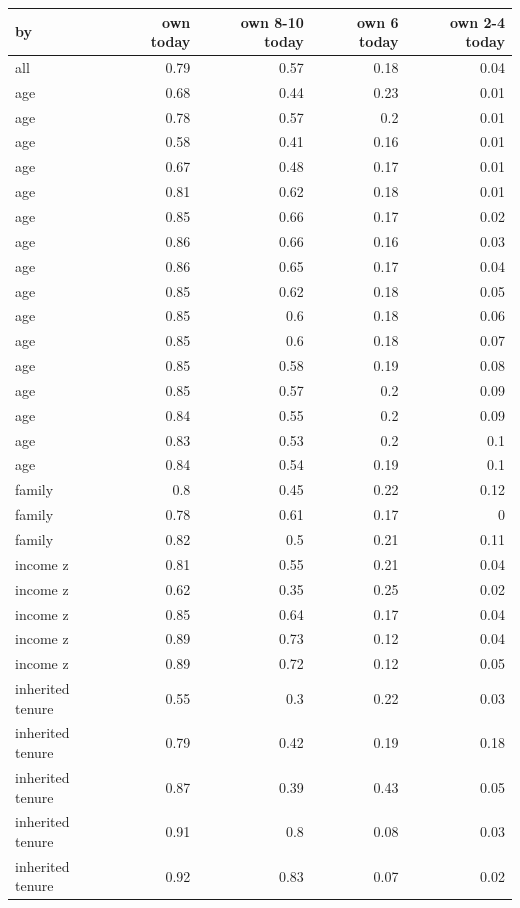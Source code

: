 \begin{tabular}{lrrrr}
\toprule
by & own today & own 8-10 today & own 6 today & own 2-4 today \\
\midrule
all & 0.79 & 0.57 & 0.18 & 0.04 \\
age & 0.68 & 0.44 & 0.23 & 0.01 \\
age & 0.78 & 0.57 & 0.2 & 0.01 \\
age & 0.58 & 0.41 & 0.16 & 0.01 \\
age & 0.67 & 0.48 & 0.17 & 0.01 \\
age & 0.81 & 0.62 & 0.18 & 0.01 \\
age & 0.85 & 0.66 & 0.17 & 0.02 \\
age & 0.86 & 0.66 & 0.16 & 0.03 \\
age & 0.86 & 0.65 & 0.17 & 0.04 \\
age & 0.85 & 0.62 & 0.18 & 0.05 \\
age & 0.85 & 0.6 & 0.18 & 0.06 \\
age & 0.85 & 0.6 & 0.18 & 0.07 \\
age & 0.85 & 0.58 & 0.19 & 0.08 \\
age & 0.85 & 0.57 & 0.2 & 0.09 \\
age & 0.84 & 0.55 & 0.2 & 0.09 \\
age & 0.83 & 0.53 & 0.2 & 0.1 \\
age & 0.84 & 0.54 & 0.19 & 0.1 \\
family & 0.8 & 0.45 & 0.22 & 0.12 \\
family & 0.78 & 0.61 & 0.17 & 0 \\
family & 0.82 & 0.5 & 0.21 & 0.11 \\
income z & 0.81 & 0.55 & 0.21 & 0.04 \\
income z & 0.62 & 0.35 & 0.25 & 0.02 \\
income z & 0.85 & 0.64 & 0.17 & 0.04 \\
income z & 0.89 & 0.73 & 0.12 & 0.04 \\
income z & 0.89 & 0.72 & 0.12 & 0.05 \\
inherited tenure & 0.55 & 0.3 & 0.22 & 0.03 \\
inherited tenure & 0.79 & 0.42 & 0.19 & 0.18 \\
inherited tenure & 0.87 & 0.39 & 0.43 & 0.05 \\
inherited tenure & 0.91 & 0.8 & 0.08 & 0.03 \\
inherited tenure & 0.92 & 0.83 & 0.07 & 0.02 \\
\bottomrule
\end{tabular}

